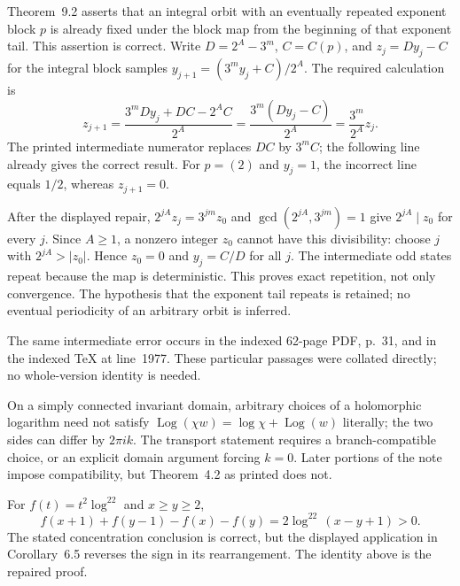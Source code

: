 \begin{sourceissue}
\label{issue:affine-periodic-tail-expansion}
Theorem~9.2 asserts that an integral orbit with an eventually repeated
exponent block $p$ is already fixed under the block map from the beginning
of that exponent tail.  This assertion is correct.  Write
$D=2^A-3^m$, $C=C(p)$, and $z_j=Dy_j-C$ for the integral block samples
$y_{j+1}=(3^my_j+C)/2^A$.  The required calculation is
\[
 z_{j+1}
 =\frac{3^mDy_j+DC-2^AC}{2^A}
 =\frac{3^m(Dy_j-C)}{2^A}
 =\frac{3^m}{2^A}z_j.
\]
The printed intermediate numerator replaces $DC$ by $3^mC$; the
following line already gives the correct result.  For $p=(2)$ and
$y_j=1$, the incorrect line equals $1/2$, whereas $z_{j+1}=0$.

After the displayed repair, $2^{jA}z_j=3^{jm}z_0$ and
$\gcd(2^{jA},3^{jm})=1$ give $2^{jA}\mid z_0$ for every $j$.
Since $A\ge1$, a nonzero integer $z_0$ cannot have this divisibility:
choose $j$ with $2^{jA}>|z_0|$.  Hence $z_0=0$ and $y_j=C/D$ for
all $j$.  The intermediate odd states repeat because the map is
deterministic.  This proves exact repetition, not only convergence.
The hypothesis that the exponent tail repeats is retained; no eventual
periodicity of an arbitrary orbit is inferred.

The same intermediate error occurs in the indexed 62-page PDF, p.~31,
and in the indexed TeX at line~1977.  These particular passages were
collated directly; no whole-version identity is needed.
\end{sourceissue}

\begin{sourceissue}
On a simply connected invariant domain, arbitrary choices of a holomorphic
logarithm need not satisfy
$\operatorname{Log}(\chi w)=\log\chi+\operatorname{Log}(w)$ literally; the
two sides can differ by $2\pi i k$.  The transport statement requires a
branch-compatible choice, or an explicit domain argument forcing $k=0$.
Later portions of the note impose compatibility, but Theorem~4.2 as printed
does not.
\end{sourceissue}

\begin{sourceissue}
For $f(t)=t^2\log^22$ and $x\ge y\ge2$,
\[
 f(x+1)+f(y-1)-f(x)-f(y)
 =2\log^22\,(x-y+1)>0.
\]
The stated concentration conclusion is correct, but the displayed
application in Corollary~6.5 reverses the sign in its rearrangement.  The
identity above is the repaired proof.
\end{sourceissue}

